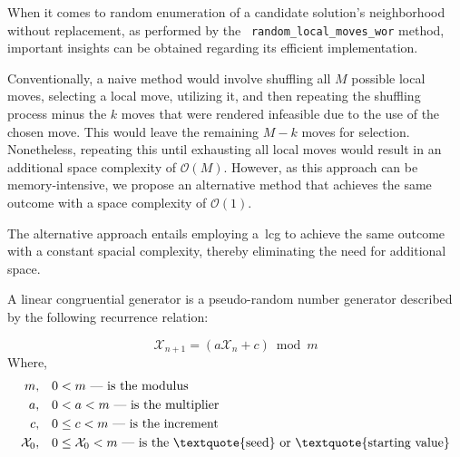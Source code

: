 \begin{center}

\end{center}

When it comes to random enumeration of a candidate solution's neighborhood
without replacement, as performed by the ~\texttt{random\_local\_moves\_wor} method,
important insights can be obtained regarding its efficient implementation.

Conventionally, a naive method would involve shuffling all $M$ possible local
moves, selecting a local move, utilizing it, and then repeating the shuffling
process minus the $k$ moves that were rendered infeasible due to the use of the
chosen move. This would leave the remaining $M - k$ moves for selection.
Nonetheless, repeating this until exhausting all local moves would result in an
additional space complexity of $\mathcal{O}(M)$. However, as this approach can
be memory-intensive, we propose an alternative method that achieves the same
outcome with a space complexity of $\mathcal{O}(1)$.

The alternative approach entails employing a~\acrfull{lcg} to achieve the same
outcome with a constant spacial complexity, thereby eliminating the need for
additional space.

\begin{definition}
  A linear congruential generator is a pseudo-random number generator
  described by the following recurrence relation:

  \begin{equation}
    \mathcal{X}_{n+1} = (a\mathcal{X}_{n} + c) \bmod m
  \end{equation}
  Where,
  \begin{align*}
    m,               & \quad 0 < m \text{ — is the modulus}                                                             \\
    a,               & \quad 0 < a < m \text{ — is the multiplier}                                                      \\
    c,               & \quad 0 \leq c < m \text{ — is the increment}                                                    \\
    \mathcal{X}_{0}, & \quad 0 \leq \mathcal{X}_{0} < m \text{ — is the \textquote{seed} or \textquote{starting value}}
  \end{align*}
\end{definition}

